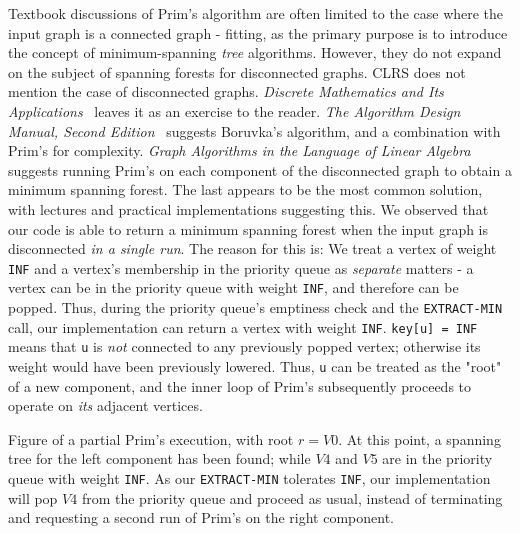 Textbook discussions of Prim's algorithm are often limited to the case where the input graph is a connected graph - fitting, as the primary purpose is to introduce the concept of minimum-spanning \textit{tree} algorithms. However, they do not expand on the subject of spanning forests for disconnected graphs. CLRS does not mention the case of disconnected graphs. \textit{Discrete Mathematics and Its Applications}~\cite{rozen} leaves it as an exercise to the reader. \textit{The Algorithm Design Manual, Second Edition}~\cite{DBLP:books/daglib/0022194} suggests Boruvka’s algorithm, and a combination with Prim's for complexity. \textit{Graph Algorithms in the Language of Linear Algebra}~\cite{kepnergilbert} suggests running Prim's on each component of the disconnected graph to obtain a minimum spanning forest. The last appears to be the most common solution, with lectures and practical implementations suggesting this.
\newline\newline
We observed that our code is able to return a minimum spanning forest when the input graph is disconnected \textit{in a single run}. The reason for this is: We treat a vertex of weight \texttt{INF} and a vertex's membership in the priority queue as \textit{separate} matters - a vertex can be in the priority queue with weight \texttt{INF}, and therefore can be popped. Thus, during the priority queue's emptiness check and the \texttt{EXTRACT-MIN} call, our implementation can return a vertex with weight \texttt{INF}. \texttt{key[u] = INF} means that \texttt{u} is \textit{not} connected to any previously popped vertex; otherwise its weight would have been previously lowered. Thus, \texttt{u} can be treated as the "root" of a new component, and the inner loop of Prim's subsequently proceeds to operate on \textit{its} adjacent vertices.
\newline
\begin{center}
\newline
Figure of a partial Prim's execution, with root $r = V0$. At this point, a spanning tree for the left component has been found; while $V4$ and $V5$ are in the priority queue with weight \texttt{INF}. As our \texttt{EXTRACT-MIN} tolerates \texttt{INF}, our implementation will pop $V4$ from the priority queue and proceed as usual, instead of terminating and requesting a second run of Prim's on the right component.
\newline
\end{center}
